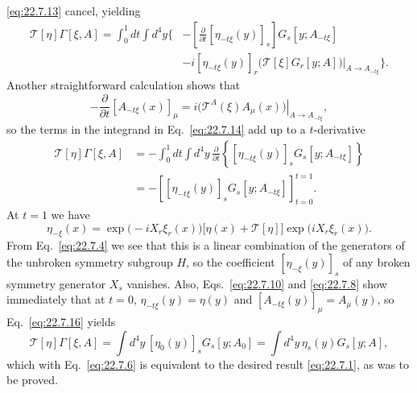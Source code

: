 \eqref{eq:22.7.13} cancel, yielding
\begin{equation}
 \begin{aligned}
 \mathcal T[\eta]\Gamma[\xi,A]
 =\int_0^1dt\int d^4y\Biggl\{
 &-\left[\frac{\partial}{\partial t}
 [\eta_{-t\xi}(y)]_s\right]G_s[y;A_{-t\xi}]
 \\
 &-i[\eta_{-t\xi}(y)]_r
 \left.
 \bigl(\mathcal T[\xi]G_r[y;A]\bigr)
 \right|_{A\to A_{-t\xi}}
 \Biggr\}.
 \end{aligned}
 \tag{22.7.14}\label{eq:22.7.14}
\end{equation}
Another straightforward calculation shows that
\begin{equation}
 -\frac{\partial}{\partial t}[A_{-t\xi}(x)]_\mu
 =i\left.
 \bigl(\mathcal T^A(\xi)A_\mu(x)\bigr)
 \right|_{A\to A_{-t\xi}},
 \tag{22.7.15}\label{eq:22.7.15}
\end{equation}
so the terms in the integrand in Eq.~\eqref{eq:22.7.14} add up to a
$t$-derivative
\begin{equation}
 \begin{aligned}
 \mathcal T[\eta]\Gamma[\xi,A]
 &=-\int_0^1 dt\int d^4y\,\frac{\partial}{\partial t}
 \left\{[\eta_{-t\xi}(y)]_sG_s[y;A_{-t\xi}]\right\}
 \\
 &=-\left[
 [\eta_{-t\xi}(y)]_sG_s[y;A_{-t\xi}]
 \right]_{t=0}^{t=1}.
 \end{aligned}
 \tag{22.7.16}\label{eq:22.7.16}
\end{equation}
At $t=1$ we have
\[
 \eta_{-\xi}(x)
 =\exp\bigl(-iX_r\xi_r(x)\bigr)
 \bigl[\eta(x)+\mathcal T[\eta]\bigr]
 \exp\bigl(iX_r\xi_r(x)\bigr).
\]
From Eq.~\eqref{eq:22.7.4} we see that this is a linear combination of
the generators of the unbroken symmetry subgroup $H$, so the coefficient
$[\eta_{-\xi}(y)]_s$ of any broken symmetry generator $X_s$ vanishes.
Also, Eqs.~\eqref{eq:22.7.10} and \eqref{eq:22.7.8} show immediately
that at $t=0$, $\eta_{-t\xi}(y)=\eta(y)$ and
$[A_{-t\xi}(y)]_\mu=A_\mu(y)$, so Eq.~\eqref{eq:22.7.16} yields
\begin{equation}
 \mathcal T[\eta]\Gamma[\xi,A]
 =\int d^4y\,[\eta_0(y)]_sG_s[y;A_0]
 =\int d^4y\,\eta_s(y)G_s[y;A],
 \tag{22.7.17}\label{eq:22.7.17}
\end{equation}
which with Eq.~\eqref{eq:22.7.6} is equivalent to the desired result
\eqref{eq:22.7.1}, as was to be proved.\par\medskip

